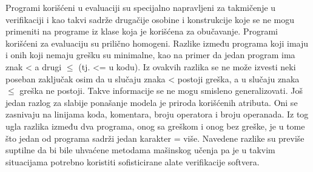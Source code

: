\documentclass[12pt,oneside]{memoir}
\begin{document}
Programi korišćeni u evaluaciji su specijalno napravljeni za takmičenje u verifikaciji i kao takvi sadrže drugačije osobine i konstrukcije koje se ne mogu primeniti na programe iz klase koja je korišćena za obučavanje. Programi korišćeni za evaluaciju su prilično homogeni. Razlike između programa koji imaju i onih koji nemaju grešku su minimalne, kao na primer da jedan program ima znak < a drugi $\leq$ (tj. <= u kodu). Iz ovakvih razlika se ne može izvesti neki poseban zaključak osim da u slučaju znaka < postoji greška, a u slučaju znaka $\leq$ greška ne postoji. Takve informacije se ne mogu smisleno generalizovati. Još jedan razlog za slabije ponašanje modela je priroda korišćenih atributa. Oni se zasnivaju na linijama koda, komentara, broju operatora i broju operanada. Iz tog ugla razlika između dva programa, onog sa greškom i onog bez greške, je u tome što jedan od programa sadrži jedan karakter = više. Navedene razlike su previše suptilne da bi bile uhvaćene metodama mašinskog učenja pa je u takvim situacijama potrebno koristiti sofisticirane alate verifikacije softvera.









\end{document}

